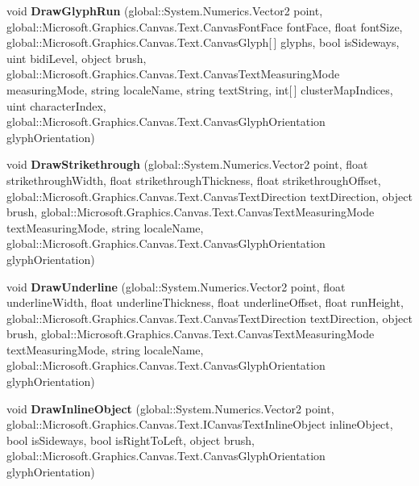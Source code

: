 \begin{DoxyCompactItemize}
void {\bfseries Draw\+Glyph\+Run} (global\+::\+System.\+Numerics.\+Vector2 point, global\+::\+Microsoft.\+Graphics.\+Canvas.\+Text.\+Canvas\+Font\+Face font\+Face, float font\+Size, global\+::\+Microsoft.\+Graphics.\+Canvas.\+Text.\+Canvas\+Glyph\mbox{[}$\,$\mbox{]} glyphs, bool is\+Sideways, uint bidi\+Level, object brush, global\+::\+Microsoft.\+Graphics.\+Canvas.\+Text.\+Canvas\+Text\+Measuring\+Mode measuring\+Mode, string locale\+Name, string text\+String, int\mbox{[}$\,$\mbox{]} cluster\+Map\+Indices, uint character\+Index, global\+::\+Microsoft.\+Graphics.\+Canvas.\+Text.\+Canvas\+Glyph\+Orientation glyph\+Orientation)
\item 
\mbox{\label{interface_microsoft_1_1_graphics_1_1_canvas_1_1_text_1_1_i_canvas_text_renderer_a554332d1d991fdd8a01a27fe4b6ce0d0}} 
void {\bfseries Draw\+Strikethrough} (global\+::\+System.\+Numerics.\+Vector2 point, float strikethrough\+Width, float strikethrough\+Thickness, float strikethrough\+Offset, global\+::\+Microsoft.\+Graphics.\+Canvas.\+Text.\+Canvas\+Text\+Direction text\+Direction, object brush, global\+::\+Microsoft.\+Graphics.\+Canvas.\+Text.\+Canvas\+Text\+Measuring\+Mode text\+Measuring\+Mode, string locale\+Name, global\+::\+Microsoft.\+Graphics.\+Canvas.\+Text.\+Canvas\+Glyph\+Orientation glyph\+Orientation)
\item 
\mbox{\label{interface_microsoft_1_1_graphics_1_1_canvas_1_1_text_1_1_i_canvas_text_renderer_a2e1cdd345444973833ad4a9f67ce1601}} 
void {\bfseries Draw\+Underline} (global\+::\+System.\+Numerics.\+Vector2 point, float underline\+Width, float underline\+Thickness, float underline\+Offset, float run\+Height, global\+::\+Microsoft.\+Graphics.\+Canvas.\+Text.\+Canvas\+Text\+Direction text\+Direction, object brush, global\+::\+Microsoft.\+Graphics.\+Canvas.\+Text.\+Canvas\+Text\+Measuring\+Mode text\+Measuring\+Mode, string locale\+Name, global\+::\+Microsoft.\+Graphics.\+Canvas.\+Text.\+Canvas\+Glyph\+Orientation glyph\+Orientation)
\item 
\mbox{\label{interface_microsoft_1_1_graphics_1_1_canvas_1_1_text_1_1_i_canvas_text_renderer_a4ee8342ead2546751b855325b3e50a38}} 
void {\bfseries Draw\+Inline\+Object} (global\+::\+System.\+Numerics.\+Vector2 point, global\+::\+Microsoft.\+Graphics.\+Canvas.\+Text.\+I\+Canvas\+Text\+Inline\+Object inline\+Object, bool is\+Sideways, bool is\+Right\+To\+Left, object brush, global\+::\+Microsoft.\+Graphics.\+Canvas.\+Text.\+Canvas\+Glyph\+Orientation glyph\+Orientation)

\end{DoxyCompactItemize}
